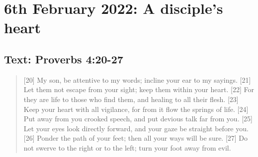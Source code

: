 \section{6th February 2022: A disciple's heart}
\subsection*{Text: Proverbs 4:20-27}
\begin{quote}
    [20] My son, be attentive to my words;
        incline your ear to my sayings.
    [21] Let them not escape from your sight;
        keep them within your heart.
    [22] For they are life to those who find them,
        and healing to all their flesh.
    [23] Keep your heart with all vigilance,
        for from it flow the springs of life.
    [24] Put away from you crooked speech,
        and put devious talk far from you.
    [25] Let your eyes look directly forward,
        and your gaze be straight before you.
    [26] Ponder the path of your feet;
        then all your ways will be sure.
    [27] Do not swerve to the right or to the left;
        turn your foot away from evil.
\end{quote}

